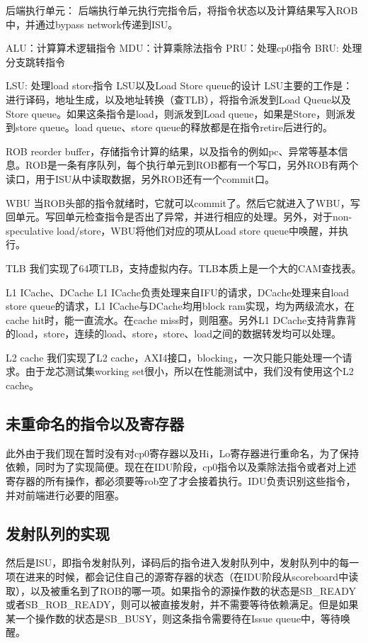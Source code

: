 \documentclass[lang=cn,11pt,a4paper]{elegantpaper}
\begin{document}
后端执行单元：
后端执行单元执行完指令后，将指令状态以及计算结果写入ROB中，并通过bypass network传递到ISU。

ALU：计算算术逻辑指令
MDU：计算乘除法指令
PRU：处理cp0指令
BRU: 处理分支跳转指令

LSU: 处理load store指令
LSU以及Load Store queue的设计
LSU主要的工作是：
进行译码，地址生成，以及地址转换（查TLB），将指令派发到Load Queue以及Store queue。如果这条指令是load，则派发到Load queue，如果是Store，则派发到store queue。load queue、store queue的释放都是在指令retire后进行的。

ROB
reorder buffer，存储指令计算的结果，以及指令的例如pc、异常等基本信息。ROB是一条有序队列，每个执行单元到ROB都有一个写口，另外ROB有两个读口，用于ISU从中读取数据，另外ROB还有一个commit口。

WBU
当ROB头部的指令就绪时，它就可以commit了。然后它就进入了WBU，写回单元。写回单元检查指令是否出了异常，并进行相应的处理。另外，对于non-speculative load/store，WBU将他们对应的项从Load store queue中唤醒，并执行。

TLB
我们实现了64项TLB，支持虚拟内存。TLB本质上是一个大的CAM查找表。

L1 ICache、DCache
L1 ICache负责处理来自IFU的请求，DCache处理来自load store queue的请求，L1 ICache与DCache均用block ram实现，均为两级流水，在cache hit时，能一直流水。在cache miss时，则阻塞。另外L1 DCache支持背靠背的load，store，连续的load、store，store、load之间的数据转发均可以处理。

L2 cache
我们实现了L2 cache，AXI4接口，blocking，一次只能只能处理一个请求。由于龙芯测试集working set很小，所以在性能测试中，我们没有使用这个L2 cache。

\subsection{未重命名的指令以及寄存器}

此外由于我们现在暂时没有对cp0寄存器以及Hi，Lo寄存器进行重命名，为了保持依赖，同时为了实现简便。现在在IDU阶段，cp0指令以及乘除法指令或者对上述寄存器的所有操作，都必须要等rob空了才会接着执行。IDU负责识别这些指令，并对前端进行必要的阻塞。

\subsection{发射队列的实现}

然后是ISU，即指令发射队列，译码后的指令进入发射队列中，发射队列中的每一项在进来的时候，都会记住自己的源寄存器的状态（在IDU阶段从scoreboard中读取），以及被重名到了ROB的哪一项。如果指令的源操作数的状态是SB\_READY或者SB\_ROB\_READY，则可以被直接发射，并不需要等待依赖满足。但是如果某一个操作数的状态是SB\_BUSY，则这条指令需要待在Issue queue中，等待唤醒。
\end{document}

